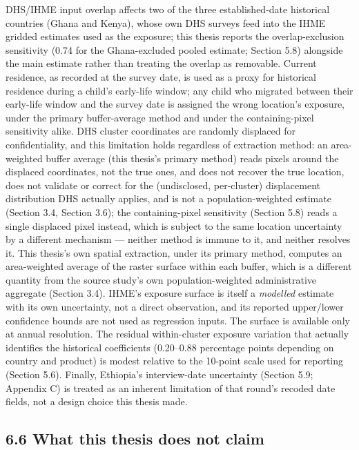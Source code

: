 DHS/IHME input overlap affects two of the three established-date historical countries (Ghana and Kenya), whose own DHS surveys feed into the IHME gridded estimates used as the exposure; this thesis reports the overlap-exclusion sensitivity (0.74 for the Ghana-excluded pooled estimate; Section 5.8) alongside the main estimate rather than treating the overlap as removable. Current residence, as recorded at the survey date, is used as a proxy for historical residence during a child's early-life window; any child who migrated between their early-life window and the survey date is assigned the wrong location's exposure, under the primary buffer-average method and under the containing-pixel sensitivity alike. DHS cluster coordinates are randomly displaced for confidentiality, and this limitation holds regardless of extraction method: an area-weighted buffer average (this thesis's primary method) reads pixels around the displaced coordinates, not the true ones, and does not recover the true location, does not validate or correct for the (undisclosed, per-cluster) displacement distribution DHS actually applies, and is not a population-weighted estimate (Section 3.4, Section 3.6); the containing-pixel sensitivity (Section 5.8) reads a single displaced pixel instead, which is subject to the same location uncertainty by a different mechanism --- neither method is immune to it, and neither resolves it. This thesis's own spatial extraction, under its primary method, computes an area-weighted average of the raster surface within each buffer, which is a different quantity from the source study's own population-weighted administrative aggregate (Section 3.4). IHME's exposure surface is itself a \textit{modelled} estimate with its own uncertainty, not a direct observation, and its reported upper/lower confidence bounds are not used as regression inputs. The surface is available only at annual resolution. The residual within-cluster exposure variation that actually identifies the historical coefficients (0.20--0.88 percentage points depending on country and product) is modest relative to the 10-point scale used for reporting (Section 5.6). Finally, Ethiopia's interview-date uncertainty (Section 5.9; Appendix C) is treated as an inherent limitation of that round's recoded date fields, not a design choice this thesis made.

\subsection*{6.6 What this thesis does not claim}

